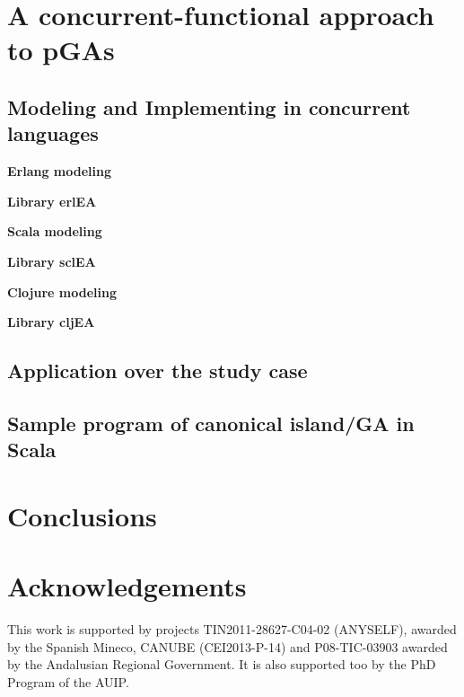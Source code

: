 \documentclass[9pt, technote]{IEEEtran}
\newcommand{\simpleEntry}[1]
{
\vspace{.3cm}
\noindent \textbf{#1}
\vspace{.3cm}
}
\begin{document}
\section{A concurrent-functional approach to pGAs}
\label{sec:design}
    

\subsection{Modeling and Implementing in concurrent languages}
\label{sec:impl}
    

\simpleEntry{Erlang modeling}
    

\simpleEntry{Library erlEA}
    

\simpleEntry{Scala modeling}
    

\simpleEntry{Library sclEA}
    

\simpleEntry{Clojure modeling}
    

\simpleEntry{Library cljEA}
    

\subsection{Application over the study case} \label{sec:results}%
    

\subsection{Sample program of canonical island/GA in Scala}\label{sec:sample}


\section{Conclusions}
\label{sec:conclusions}
    


\section{Acknowledgements}

This work is supported by projects TIN2011-28627-C04-02 (ANYSELF),
awarded by the Spanish Mineco, CANUBE (CEI2013-P-14) and P08-TIC-03903 awarded by the Andalusian Regional Government. It is also supported too by the PhD
Program of the AUIP.


%




\end{document}
